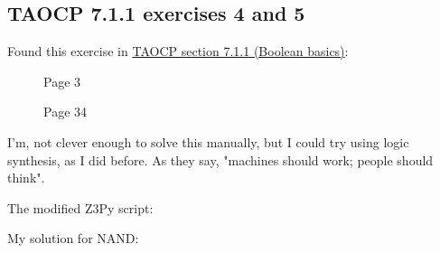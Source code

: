 \subsection{TAOCP 7.1.1 exercises 4 and 5}

Found this exercise in \href{http://www.cs.utsa.edu/~wagner/knuth/fasc0b.pdf}{TAOCP section 7.1.1 (Boolean basics)}:

\begin{figure}[H]
\centering
{}
\caption{Page 3}
\end{figure}

\begin{figure}[H]
\centering
{}
\caption{Page 34}
\end{figure}

I'm, not clever enough to solve this manually, but I could try using logic synthesis, as I did before.
As they say, "machines should work; people should think".

The modified Z3Py script:



My solution for NAND:

